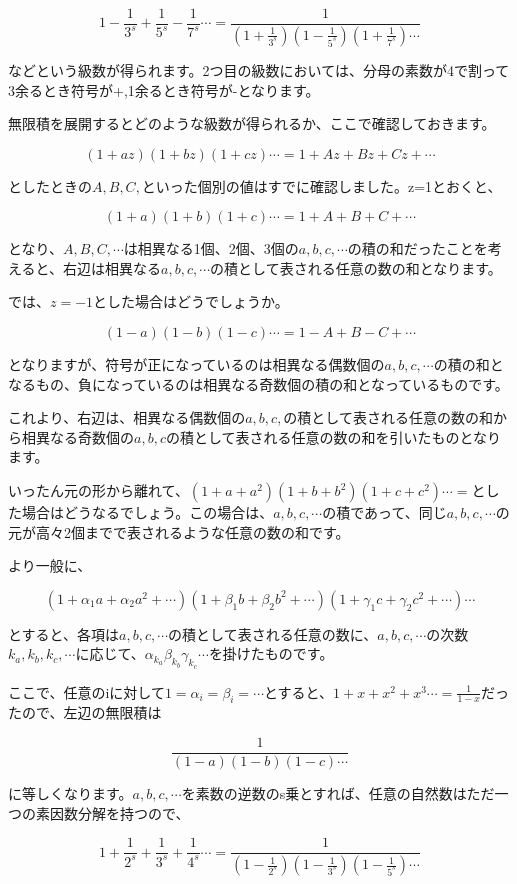 \documentclass[a4paper]{jsarticle}
\theoremstyle{break}
\begin{document}
\[1-\frac{1}{3^s}+\frac{1}{5^s}-\frac{1}{7^s}\cdots =\frac{1}{\left( 1+\frac{1}{3^s} \right)\left( 1-\frac{1}{5^s} \right)\left( 1+\frac{1}{7^s} \right)\cdots}\]

などという級数が得られます。2つ目の級数においては、分母の素数が4で割って3余るとき符号が+,1余るとき符号が-となります。

無限積を展開するとどのような級数が得られるか、ここで確認しておきます。

\[(1+az)(1+bz)(1+cz)\cdots=1+Az+Bz+Cz+\cdots\]

としたときの$A,B,C,$といった個別の値はすでに確認しました。z=1とおくと、

\[(1+a)(1+b)(1+c)\cdots=1+A+B+C+\cdots\]

となり、$A,B,C,\cdots$は相異なる1個、2個、3個の$a,b,c,\cdots$の積の和だったことを考えると、右辺は相異なる$a,b,c,\cdots$の積として表される任意の数の和となります。

では、$z=-1$とした場合はどうでしょうか。

\[(1-a)(1-b)(1-c)\cdots=1-A+B-C+\cdots\]

となりますが、符号が正になっているのは相異なる偶数個の$a,b,c,\cdots$の積の和となるもの、負になっているのは相異なる奇数個の積の和となっているものです。

これより、右辺は、相異なる偶数個の$a,b,c,$の積として表される任意の数の和から相異なる奇数個の$a,b,c$の積として表される任意の数の和を引いたものとなります。

いったん元の形から離れて、$(1+a+a^2)(1+b+b^2)(1+c+c^2)\cdots=$とした場合はどうなるでしょう。この場合は、$a,b,c,\cdots$の積であって、同じ$a,b,c,\cdots$の元が高々2個までで表されるような任意の数の和です。

より一般に、

\[(1+\alpha_1a+\alpha_2a^2+\cdots)(1+\beta_1b+\beta_2b^2+\cdots)(1+\gamma_1c+\gamma_2c^2+\cdots)\cdots\]

とすると、各項は$a,b,c,\cdots$の積として表される任意の数に、$a,b,c,\cdots$の次数$k_a,k_b,k_c,\cdots$に応じて、$\alpha_{k_a}\beta_{k_b}\gamma_{k_c}\cdots$を掛けたものです。

ここで、任意のiに対して$1=\alpha_i=\beta_i=\cdots$とすると、$1+x+x^2+x^3\cdots=\frac{1}{1-x}$だったので、左辺の無限積は

\[\frac{1}{(1-a)(1-b)(1-c)\cdots}\]

に等しくなります。$a,b,c,\cdots$を素数の逆数のs乗とすれば、任意の自然数はただ一つの素因数分解を持つので、

\[1+\frac{1}{2^s}+\frac{1}{3^s}+\frac{1}{4^s}\cdots =\frac{1}{\left( 1-\frac{1}{2^s} \right)\left( 1-\frac{1}{3^s} \right)\left( 1-\frac{1}{5^s} \right)\cdots}\]
\end{document}
